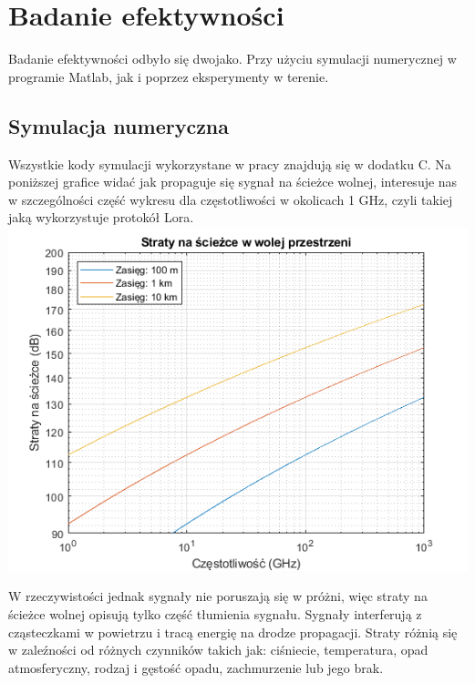 \chapter{Badanie efektywności}
Badanie efektywności odbyło się dwojako. Przy użyciu symulacji numerycznej w programie Matlab, jak i poprzez eksperymenty w terenie.
\section{Symulacja numeryczna}
Wszystkie kody symulacji wykorzystane w pracy znajdują się w dodatku C.
Na poniższej grafice widać jak propaguje się sygnał na ścieżce wolnej, interesuje nas w szczególności część wykresu dla częstotliwości w okolicach 1 GHz, czyli takiej jaką wykorzystuje protokół Lora.
\includegraphics*{./grafika/num_sim1_straty_na_sciezce.png}

W rzeczywistości jednak sygnały nie poruszają się w próżni, więc straty na ścieżce wolnej opisują tylko część tłumienia sygnału.
Sygnały interferują z cząsteczkami w powietrzu i tracą energię na drodze propagacji. Straty różnią się w zaleźności od różnych czynników takich jak: ciśniecie, temperatura, opad atmosferyczny, rodzaj i gęstość opadu, zachmurzenie lub jego brak.

